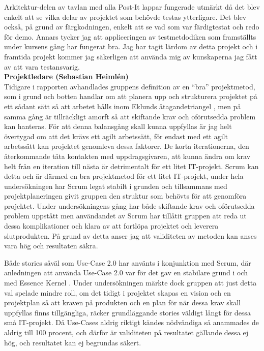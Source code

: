 \documentclass[conference,a4paper]{IEEEtran}
\begin{document}
Arkitektur-delen av tavlan med alla Post-It lappar fungerade utmärkt då det blev enkelt att se vilka delar av projektet som behövde testas ytterligare. Det blev också, på grund av färgkodningen, enkelt att se vad som var färdigtestat och redo för demo. Annars tycker jag att appliceringen av testmetdodiken som framställts under kursens gång har fungerat bra.  
Jag har tagit lärdom av detta projekt och i framtida projekt kommer jag säkerligen att använda mig av kunskaperna jag fått av att vara testansvarig. 
\\

\noindent \textbf{Projektledare (Sebastian Heimlén)}\\
Tidigare i rapporten avhandlades gruppens definition av en ``bra'' projektmetod, som i grund och botten handlar om att planera upp och strukturera projektet på ett sådant sätt så att arbetet hålls inom Eklunds åtagandetriangel \cite[s. 128-129]{Eklund14}, men på samma gång är tillräckligt amorft så att skiftande krav och oförutsedda problem kan hanteras. För att denna balansgång skall kunna uppfyllas är jag helt övertygad om att det krävs ett agilt arbetssätt, för endast med ett agilt arbetssätt kan projektet genomleva dessa faktorer. De korta iterationerna, den återkommande täta kontakten med uppdragsgivaren, att kunna ändra om krav helt från en iteration till nästa är detrimentalt för ett litet IT-projekt. Scrum kan detta och är därmed en bra projektmetod för ett litet IT-projekt, under hela undersökningen har Scrum legat stabilt i grunden och tillsammans med projektplaneringen givit gruppen den struktur som behövts för att genomföra projektet. Under undersökningens gång har både skiftande krav och oförutsedda problem uppstått men användandet av Scrum har tillåtit gruppen att reda ut dessa komplikationer och klara av att fortlöpa projektet och leverera slutprodukten. På grund av detta anser jag att validiteten av metoden kan anses vara hög och resultaten säkra.

Både stories såväl som Use-Case 2.0 har använts i konjunktion med Scrum, där anledningen att använda Use-Case 2.0 var för det gav en stabilare grund i och med Essence Kernel \cite{Jacobson11}. Under undersökningen märkte dock gruppen att just detta val spelade mindre roll, om det tidigt i projektet skapas en vision och en projektplan så att kraven på produkten och en plan för när dessa krav skall uppfyllas finns tillgängliga, räcker grundläggande stories väldigt långt för dessa små IT-projekt. Då Use-Cases aldrig riktigt kändes nödvändiga så anammades de aldrig till 100 procent, och därför är validiteten på resultatet gällande dessa ej hög, och resultatet kan ej begrundas säkert.
\end{document}

